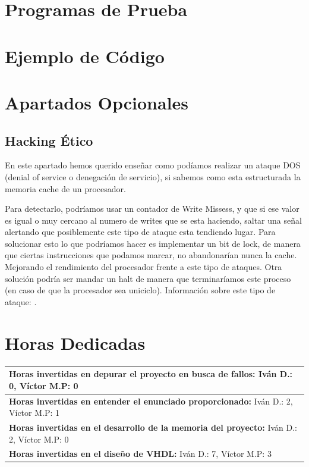 \documentclass{article}
\newcommand{\horasVhdl}[2]{\textbf{Horas invertidas en el diseño de VHDL:} Iván D.: #1, Víctor M.P: #2\par\nointerlineskip}
\newcommand{\horasEntenderEnunciado}[2]{\textbf{Horas invertidas en entender el enunciado proporcionado:} Iván D.: #1, Víctor M.P: #2\par\nointerlineskip}
\newcommand{\horasDepuracion}[2]{\textbf{Horas invertidas en depurar el proyecto en busca de fallos:} Iván D.: #1, Víctor M.P: #2\par\nointerlineskip}
\newcommand{\horasMemoria}[2]{\textbf{Horas invertidas en el desarrollo de la memoria del proyecto:} Iván D.: #1, Víctor M.P: #2\par\nointerlineskip}
\begin{document}
\section{Programas de Prueba}
\lipsum[10-12]

\section{Ejemplo de Código}
\lipsum[13-14]

\section{Apartados Opcionales}
\subsection{Hacking Ético}
En este apartado hemos querido enseñar como podíamos realizar un ataque DOS (denial of service o denegación de servicio), si sabemos como esta estructurada la memoria cache de un procesador.\par
Para detectarlo, podríamos usar un contador de Write Missess, y que si ese valor es igual o muy cercano al numero de writes que se esta haciendo, saltar una señal alertando que posiblemente este tipo de ataque esta tendiendo lugar. 
Para solucionar esto lo que podríamos hacer es implementar un bit de lock, de manera que ciertas instrucciones que podamos marcar, no abandonarían nunca la cache. Mejorando el rendimiento del procesador frente a este tipo de ataques. Otra solución podría ser mandar un 
halt de manera que terminaríamos este proceso (en caso de que la procesador sea uniciclo). 
Información sobre este tipo de ataque: \cite{BackCache}.

\section{Horas Dedicadas}

\begin{table}[h]
\centering
\begin{tabularx}{\textwidth}{|X|}
\hline
\horasDepuracion{0}{0} \\
\hline
\horasEntenderEnunciado{2}{1} \\
\hline
\horasMemoria{2}{0} \\
\hline
\horasVhdl{7}{3} \\
\hline
\end{tabularx}
\end{table}
\end{document}
